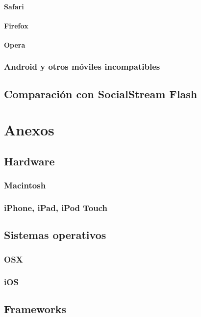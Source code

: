 		\subsubsection{Safari}
		\subsubsection{Firefox}
		\subsubsection{Opera}
	\subsection{Android y otros móviles incompatibles}
\section{Comparación con SocialStream Flash}

\chapter{Anexos}
	\section{Hardware}
		\subsection{Macintosh}
		\subsection{iPhone, iPad, iPod Touch}
	\section{Sistemas operativos}
		\subsection{OSX}
		\subsection{iOS}
	\section{Frameworks}